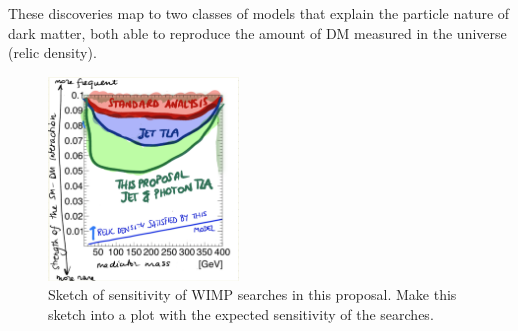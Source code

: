 \documentclass[11pt,a4paper]{article}
\begin{document}
These discoveries map to two classes of models that explain the particle nature of dark matter, both able to reproduce the amount of DM measured in the universe (relic density). 

\begin{figure} 
\begin{center}
\includegraphics[width=0.45\textwidth]{figs/SensitivityWIMP.png}
\caption{Sketch of sensitivity of WIMP searches in this proposal. \scriptsize \color{red} Make this sketch into a plot with the expected sensitivity of the searches. \color{black}\label{fig:pastFutureConstraints} }
\end{center}
\end{figure}
\end{document}
